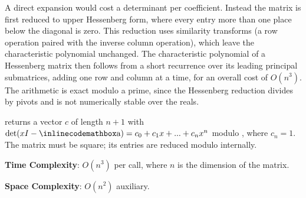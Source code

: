 A direct expansion would cost a determinant per coefficient. Instead the matrix is first reduced to upper Hessenberg form, where every entry more than one place below the diagonal is zero. This reduction uses similarity transforms (a row operation paired with the inverse column operation), which leave the characteristic polynomial unchanged. The characteristic polynomial of a Hessenberg matrix then follows from a short recurrence over its leading principal submatrices, adding one row and column at a time, for an overall cost of $O(n^{3})$. The arithmetic is exact modulo a prime, since the Hessenberg reduction divides by pivots and is not numerically stable over the reals.

\begin{compactitem}
  \item {} returns a vector $c$ of length $n + 1$ with $\det(xI - {\inlinecodemath{a}}) = c_0 + c_1 x + ... + c_n x^n$ modulo , where $c_n = 1$. The matrix  must be square; its entries are reduced modulo  internally.
\end{compactitem}

\textbf{Time Complexity}: $O(n^{3})$ per call, where $n$ is the dimension of the matrix.

\textbf{Space Complexity}: $O(n^{2})$ auxiliary.


